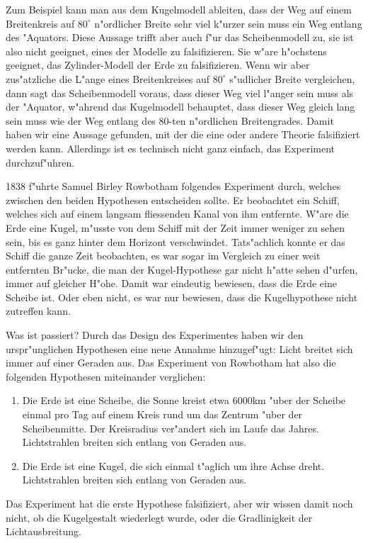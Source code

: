 Zum Beispiel kann man aus dem Kugelmodell ableiten, dass der Weg
auf einem Breitenkreis auf $80^\circ$ n"ordlicher Breite
sehr viel k"urzer sein muss ein Weg entlang des "Aquators.
Diese Aussage trifft aber auch f"ur das Scheibenmodell zu, sie
ist also nicht geeignet, eines der Modelle zu falsifizieren.
Sie w"are h"ochstens geeignet, das Zylinder-Modell der Erde
zu falsifizieren.
Wenn wir aber zus"atzliche die L"ange eines Breitenkreises 
auf $80^\circ$ s"udlicher Breite vergleichen, dann sagt
das Scheibenmodell voraus, dass dieser Weg viel l"anger
sein muss als der "Aquator, w"ahrend das Kugelmodell behauptet,
dass dieser Weg gleich lang sein muss wie der Weg entlang des
$80$-ten n"ordlichen Breitengrades.
Damit haben wir eine Aussage gefunden, mit der die eine oder andere
Theorie falsifiziert werden kann.
Allerdings ist es technisch nicht ganz einfach, das Experiment
durchzuf"uhren.

1838 f"uhrte Samuel Birley Rowbotham folgendes Experiment durch,
welches zwischen den beiden Hypothesen entscheiden sollte.
Er beobachtet ein Schiff, welches sich auf einem langsam fliessenden
Kanal von ihm entfernte.
W"are die Erde eine Kugel, m"usste von dem Schiff mit der Zeit
immer weniger zu sehen sein, bis es ganz hinter dem Horizont
verschwindet.
Tats"achlich konnte er das Schiff die ganze Zeit beobachten, es
war sogar im Vergleich zu einer weit entfernten Br"ucke, die
man der Kugel-Hypothese gar nicht h"atte sehen d"urfen, immer auf
gleicher H"ohe.
Damit war eindeutig bewiesen, dass die Erde eine Scheibe ist.
Oder eben nicht, es war nur bewiesen, dass die Kugelhypothese
nicht zutreffen kann.

Was ist passiert? 
Durch das Design des Experimentes haben wir den urspr"unglichen
Hypothesen eine neue Annahme hinzugef"ugt: Licht breitet sich
immer auf einer Geraden aus.
Das Experiment von Rowbotham hat also die folgenden Hypothesen miteinander
verglichen:
\begin{enumerate}
\item Die Erde ist eine Scheibe, die Sonne kreist etwa 6000km "uber der
Scheibe einmal pro Tag auf einem Kreis rund um das Zentrum "uber der
Scheibenmitte. 
Der Kreisradius ver"andert sich im Laufe das Jahres.
Lichtstrahlen breiten sich entlang von Geraden aus.
\item Die Erde ist eine Kugel, die sich einmal t"aglich um ihre
Achse dreht.
Lichtstrahlen breiten sich entlang von Geraden aus.
\end{enumerate}
Das Experiment hat die erste Hypothese falsifiziert, aber wir wissen
damit noch nicht, ob die Kugelgestalt wiederlegt wurde, oder die
Gradlinigkeit der Lichtausbreitung.

